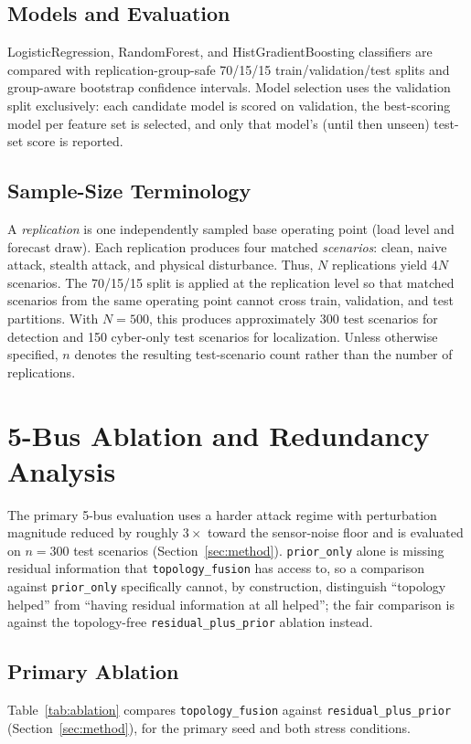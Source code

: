 \documentclass[conference]{IEEEtran}
\begin{document}
\subsection{Models and Evaluation}
LogisticRegression, RandomForest, and HistGradientBoosting classifiers are compared with replication-group-safe 70/15/15 train/validation/test splits and group-aware bootstrap confidence intervals. Model selection uses the validation split exclusively: each candidate model is scored on validation, the best-scoring model per feature set is selected, and only that model's (until then unseen) test-set score is reported.

\subsection{Sample-Size Terminology}
A \emph{replication} is one independently sampled base operating point (load level and forecast draw). Each replication produces four matched \emph{scenarios}: clean, naive attack, stealth attack, and physical disturbance. Thus, $N$ replications yield $4N$ scenarios. The 70/15/15 split is applied at the replication level so that matched scenarios from the same operating point cannot cross train, validation, and test partitions. With $N{=}500$, this produces approximately 300 test scenarios for detection and 150 cyber-only test scenarios for localization. Unless otherwise specified, $n$ denotes the resulting test-scenario count rather than the number of replications.

\section{5-Bus Ablation and Redundancy Analysis}
\label{sec:results1}

The primary 5-bus evaluation uses a harder attack regime with perturbation magnitude reduced by roughly $3\times$ toward the sensor-noise floor and is evaluated on $n{=}300$ test scenarios (Section~\ref{sec:method}). \texttt{prior\_only} alone is missing residual information that \texttt{topology\_fusion} has access to, so a comparison against \texttt{prior\_only} specifically cannot, by construction, distinguish ``topology helped'' from ``having residual information at all helped''; the fair comparison is against the topology-free \texttt{residual\_plus\_prior} ablation instead.

\subsection{Primary Ablation}
Table~\ref{tab:ablation} compares \texttt{topology\_fusion} against \texttt{residual\_plus\_prior} (Section~\ref{sec:method}), for the primary seed and both stress conditions.
\end{document}

